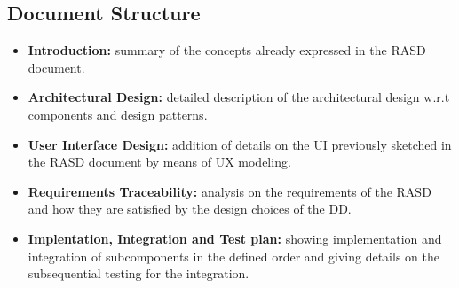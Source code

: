 \subsection{Document Structure}

\begin{itemize}

\item \textbf{Introduction:} summary of the concepts already expressed in the RASD document.
\item \textbf{Architectural Design:} detailed description of the architectural design w.r.t components and design patterns.
\item \textbf{User Interface Design:} addition of details on the UI previously sketched in the RASD document by means of UX modeling.
\item \textbf{Requirements Traceability:} analysis on the requirements of the RASD and how they are satisfied by the design choices of the DD.
\item \textbf{Implentation, Integration and Test plan:} showing implementation and integration of subcomponents in the defined order and giving details on the subsequential testing for the integration.

\end{itemize}